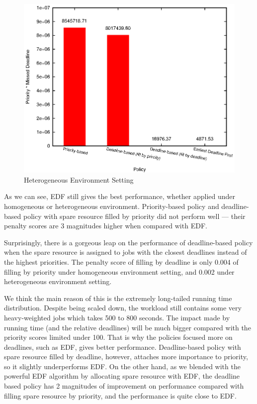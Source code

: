 \begin{figure}[htbp]
  \centering
  \includegraphics[width=\textwidth,height=0.7\textheight,keepaspectratio]{figures/hetero.eps}
  \caption{Heterogeneous Environment Setting}
  \label{fig:hetero-exp}
\end{figure}

As we can see, EDF still gives the best performance, whether applied
under homogeneous or heterogeneous environment.
Priority-based policy and deadline-based policy with spare resource
filled by priority did not perform well --- their penalty scores are 3
magnitudes higher when compared with EDF.

Surprisingly, there is a gorgeous leap on the performance of
deadline-based policy when the spare resource is assigned to jobs with
the closest deadlines instead of the highest priorities.
The penalty score of filling by deadline is only 0.004 of filling by
priority under homogeneous environment setting, and 0.002 under
heterogeneous environment setting.

We think the main reason of this is the extremely long-tailed running
time distribution.
Despite being scaled down, the workload still contains some very
heavy-weighted jobs which takes 500 to 800 seconds.
The impact made by running time (and the relative deadlines) will be
much bigger compared with the priority scores limited under 100.
That is why the policies focused more on deadlines, such as EDF, gives
better performance.
Deadline-based policy with spare resource filled by deadline, however,
attaches more importance to priority, so it slightly underperforms EDF.
On the other hand, as we blended with the powerful EDF algorithm by
allocating spare resource with EDF, the deadline based policy has 2
magnitudes of improvement on performance compared with filling spare
resource by priority, and the performance is quite close to EDF.

